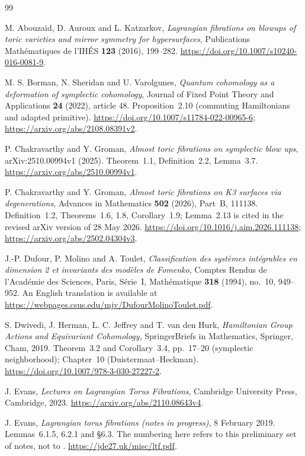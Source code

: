 \begin{thebibliography}{99}

M. Abouzaid, D. Auroux and L. Katzarkov,
\emph{Lagrangian fibrations on blowups of toric varieties and mirror symmetry for hypersurfaces},
Publications Mathématiques de l'IHÉS \textbf{123} (2016), 199--282.
\url{https://doi.org/10.1007/s10240-016-0081-9}.

M. S. Borman, N. Sheridan and U. Varolgunes,
\emph{Quantum cohomology as a deformation of symplectic cohomology},
Journal of Fixed Point Theory and Applications \textbf{24} (2022), article 48.
Proposition~2.10 (commuting Hamiltonians and adapted primitive).
\url{https://doi.org/10.1007/s11784-022-00965-6};
\url{https://arxiv.org/abs/2108.08391v2}.

P. Chakravarthy and Y. Groman,
\emph{Almost toric fibrations on symplectic blow ups},
arXiv:2510.00994v1 (2025).
Theorem~1.1, Definition~2.2, Lemma~3.7.
\url{https://arxiv.org/abs/2510.00994v1}.

P. Chakravarthy and Y. Groman,
\emph{Almost toric fibrations on K3 surfaces via degenerations},
Advances in Mathematics \textbf{502} (2026), Part~B, 111138.
Definition~1.2, Theorems~1.6, 1.8, Corollary~1.9;
Lemma~2.13 is cited in the revised arXiv version of 28 May 2026.
\url{https://doi.org/10.1016/j.aim.2026.111138};
\url{https://arxiv.org/abs/2502.04304v3}.

J.-P. Dufour, P. Molino and A. Toulet,
\emph{Classification des systèmes intégrables en dimension 2 et invariants des modèles de Fomenko},
Comptes Rendus de l'Académie des Sciences, Paris, Série~I, Mathématique
\textbf{318} (1994), no.~10, 949--952.
An English translation is available at
\url{https://webpages.csus.edu/mjv/DufourMolinoToulet.pdf}.

S. Dwivedi, J. Herman, L. C. Jeffrey and T. van den Hurk,
\emph{Hamiltonian Group Actions and Equivariant Cohomology},
SpringerBriefs in Mathematics, Springer, Cham, 2019.
Theorem~3.2 and Corollary~3.4, pp.~17--20 (symplectic neighborhood);
Chapter~10 (Duistermaat--Heckman).
\url{https://doi.org/10.1007/978-3-030-27227-2}.

J. Evans,
\emph{Lectures on Lagrangian Torus Fibrations},
Cambridge University Press, Cambridge, 2023.
\url{https://arxiv.org/abs/2110.08643v4}.

J. Evans,
\emph{Lagrangian torus fibrations (notes in progress)},
8 February 2019.
Lemmas~6.1.5, 6.2.1 and \S6.3.
The numbering here refers to this preliminary set of notes, not to \cite{Evans}.
\url{https://jde27.uk/misc/ltf.pdf}.


\end{thebibliography}

